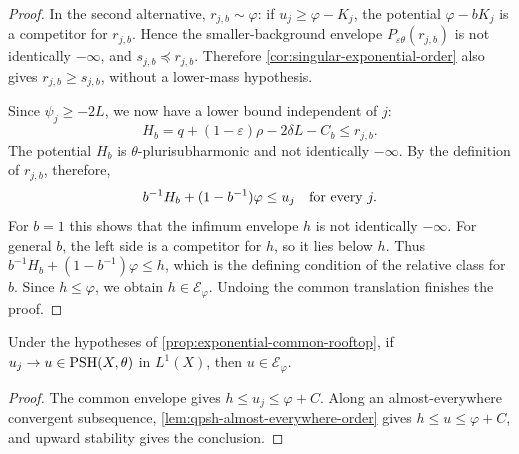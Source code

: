 \begin{proof}
In the second alternative, $r_{j,b}\sim\varphi$: if $u_j\geq\varphi-K_j$, the potential $\varphi-bK_j$ is a competitor for $r_{j,b}$. Hence the smaller-background envelope $P_{\varepsilon\theta}(r_{j,b})$ is not identically $-\infty$, and $s_{j,b}\preceq r_{j,b}$. Therefore \cref{cor:singular-exponential-order} also gives $r_{j,b}\geq s_{j,b}$, without a lower-mass hypothesis.

Since $\psi_j\geq-2L$, we now have a lower bound independent of $j$:
\[
 H_b=q+(1-\varepsilon)\rho-2\delta L-C_b
 \leq r_{j,b}.
\]
The potential $H_b$ is $\theta$-plurisubharmonic and not identically $-\infty$. By the definition of $r_{j,b}$, therefore,
\[
 b^{-1}H_b+(1-b^{-1})\varphi\leq u_j
 \quad\hbox{for every }j.
\]
For $b=1$ this shows that the infimum envelope $h$ is not identically $-\infty$. For general $b$, the left side is a competitor for $h$, so it lies below $h$. Thus $b^{-1}H_b+(1-b^{-1})\varphi\leq h$, which is the defining condition of the relative class for $b$. Since $h\leq\varphi$, we obtain $h\in\mathcal E_\varphi$. Undoing the common translation finishes the proof.
\end{proof}

\begin{corollary}\label{cor:exponential-relative-class-closure}
Under the hypotheses of \cref{prop:exponential-common-rooftop}, if $u_j\to u\in\mathrm{PSH}(X,\theta)$ in $L^1(X)$, then $u\in\mathcal E_\varphi$.
\end{corollary}
\begin{proof}
The common envelope gives $h\leq u_j\leq\varphi+C$. Along an almost-everywhere convergent subsequence, \cref{lem:qpsh-almost-everywhere-order} gives $h\leq u\leq\varphi+C$, and upward stability gives the conclusion.
\end{proof}

